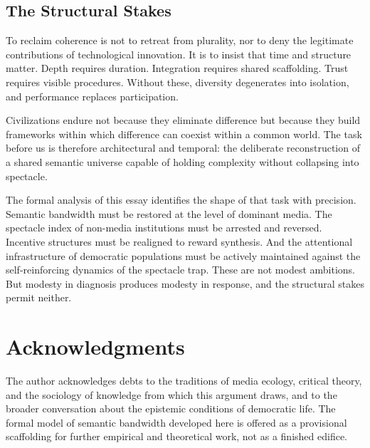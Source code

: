 \documentclass[12pt]{article}
\theoremstyle{definition}
\theoremstyle{plain}
\begin{document}
\subsection{The Structural Stakes}

To reclaim coherence is not to retreat from plurality, nor to deny the legitimate contributions of technological innovation. It is to insist that time and structure matter. Depth requires duration. Integration requires shared scaffolding. Trust requires visible procedures. Without these, diversity degenerates into isolation, and performance replaces participation.

Civilizations endure not because they eliminate difference but because they build frameworks within which difference can coexist within a common world. The task before us is therefore architectural and temporal: the deliberate reconstruction of a shared semantic universe capable of holding complexity without collapsing into spectacle.

The formal analysis of this essay identifies the shape of that task with precision. Semantic bandwidth must be restored at the level of dominant media. The spectacle index of non-media institutions must be arrested and reversed. Incentive structures must be realigned to reward synthesis. And the attentional infrastructure of democratic populations must be actively maintained against the self-reinforcing dynamics of the spectacle trap. These are not modest ambitions. But modesty in diagnosis produces modesty in response, and the structural stakes permit neither.

\newpage
\section*{Acknowledgments}
The author acknowledges debts to the traditions of media ecology, critical theory, and the sociology of knowledge from which this argument draws, and to the broader conversation about the epistemic conditions of democratic life. The formal model of semantic bandwidth developed here is offered as a provisional scaffolding for further empirical and theoretical work, not as a finished edifice.
\end{document}
